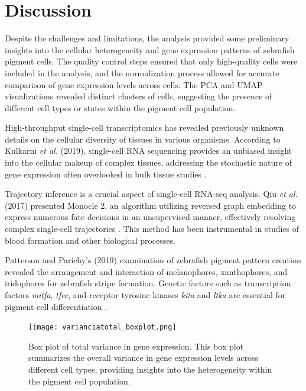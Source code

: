 \documentclass[runningheads]{llncs}
\begin{document}
\section{Discussion}

Despite the challenges and limitations, the analysis provided some preliminary insights into the cellular heterogeneity and gene expression patterns of zebrafish pigment cells. The quality control steps ensured that only high-quality cells were included in the analysis, and the normalization process allowed for accurate comparison of gene expression levels across cells. The PCA and UMAP visualizations revealed distinct clusters of cells, suggesting the presence of different cell types or states within the pigment cell population.

High-throughput single-cell transcriptomics has revealed previously unknown details on the cellular diversity of tissues in various organisms. According to Kulkarni \textit{et al.} (2019), single-cell RNA sequencing provides an unbiased insight into the cellular makeup of complex tissues, addressing the stochastic nature of gene expression often overlooked in bulk tissue studies \cite{kulkarni2019beyond}.

Trajectory inference is a crucial aspect of single-cell RNA-seq analysis. Qiu \textit{et al.} (2017) presented Monocle 2, an algorithm utilizing reversed graph embedding to express numerous fate decisions in an unsupervised manner, effectively resolving complex single-cell trajectories \cite{qiu2017reversed}. This method has been instrumental in studies of blood formation and other biological processes.

Patterson and Parichy's (2019) examination of zebrafish pigment pattern creation revealed the arrangement and interaction of melanophores, xanthophores, and iridophores for zebrafish stripe formation. Genetic factors such as transcription factors \textit{mitfa}, \textit{tfec}, and receptor tyrosine kinases \textit{kita} and \textit{ltka} are essential for pigment cell differentiation \cite{patterson2019zebrafish}.

\begin{figure}[H]
\centering
\texttt{[image: varianciatotal\_boxplot.png]}
\caption{Box plot of total variance in gene expression. This box plot summarizes the overall variance in gene expression levels across different cell types, providing insights into the heterogeneity within the pigment cell population.}
\label{results 1}
\end{figure}
\end{document}
